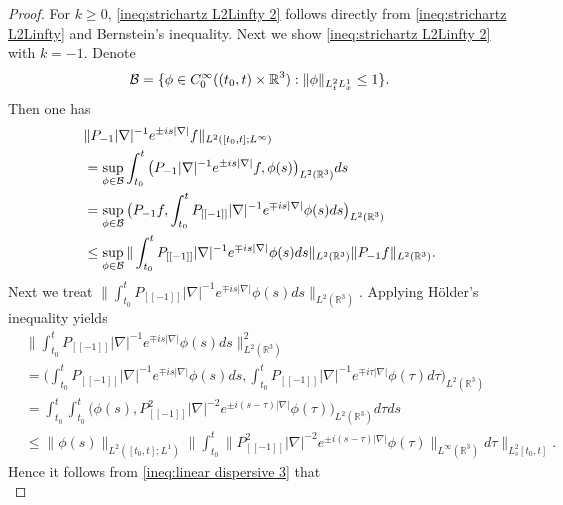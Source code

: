 \documentclass[11pt,twoside]{article}
\def\R{\mathop{\mathbb R\kern 0pt}\nolimits}
\theoremstyle{plain}
\theoremstyle{definition}
\numberwithin{equation}{section}
\begin{document}
	\begin{proof}
		For $k\ge 0$, \eqref{ineq:strichartz L2Linfty 2} follows directly from \eqref{ineq:strichartz L2Linfty} and Bernstein's inequality.
Next we show \eqref{ineq:strichartz L2Linfty 2} with $k = -1$. Denote
		\begin{equation}\label{2.118}
			\mathcal{B} = \{\phi \in C_0^\infty((t_0,t)\times\R^3): \|\phi\|_{L^{2}_tL^{1}_x}\le 1\}.
		\end{equation}
		Then one has
		\begin{equation}\label{2.119}
			\begin{split}
				&\|P_{-1} |\nabla|^{-1}e^{\pm is|\nabla|} f\|_{L^2([t_0,t];L^\infty)}\\
				&=\sup_{\phi\in \mathcal{B}}\int_{t_0}^{t}\big(P_{-1} |\nabla|^{-1} e^{\pm is|\nabla|} f,\phi(s)\big)_{L^2(\R^3)}ds\\
				&=\sup_{\phi\in \mathcal{B}}\big( P_{-1}f,\int_{t_0}^{t}P_{[[-1]]} |\nabla|^{-1}e^{\mp is|\nabla|}\phi(s)ds\big)_{L^2(\R^3)}\\
				&\le \sup_{\phi\in \mathcal{B}}\|\int_{t_0}^{t}P_{[[-1]]}|\nabla|^{-1} e^{\mp is|\nabla|}\phi(s)ds\|_{L^2(\mathbb{R}^3)}\|P_{-1} f\|_{L^2(\mathbb{R}^3)}.
			\end{split}
		\end{equation}
		Next we treat $\|\int_{t_0}^{t}P_{[[-1]]}|\nabla|^{-1} e^{\mp is|\nabla|}\phi(s)ds\|_{L^2(\mathbb{R}^3)}$.
Applying H\"older's inequality  yields
		\begin{equation}\label{2.120}
			\begin{split}
				&\|\int_{t_0}^{t}P_{[[-1]]}|\nabla|^{-1} e^{\mp is|\nabla|}\phi(s)ds\|_{L^2(\mathbb{R}^3)}^2\\
				&=\big(
				\int_{t_0}^{t}P_{[[-1]]}|\nabla|^{-1} e^{\mp is|\nabla|}\phi(s)ds,
				\int_{t_0}^{t}P_{[[-1]]}|\nabla|^{-1} e^{\mp i\tau|\nabla|}\phi(\tau)d\tau
				\big)_{L^2(\mathbb{R}^3)}\\
				&=
				\int_{t_0}^{t}\int_{t_0}^{t}\big( \phi(s),
				P_{[[-1]]}^2|\nabla|^{-2} e^{\pm i(s-\tau)|\nabla|}\phi(\tau)
				\big)_{L^2(\mathbb{R}^3)}d\tau ds\\
				&\le
				\|\phi(s)\|_{L^{2}([t_0,t];L^{1})}
				\big\|\int_{t_0}^{t}
				\|P_{[[-1]]}^2|\nabla|^{-2} e^{\pm i(s-\tau)|\nabla|} \phi(\tau) \|_{L^{\infty}(\mathbb{R}^3)} d\tau\big\|_{L^2_s[t_0,t]}.
			\end{split}
		\end{equation}
		Hence it follows from \eqref{ineq:linear dispersive 3} that
		\begin{equation}\label{2.121}

\end{equation}
\end{proof}
\end{document}
